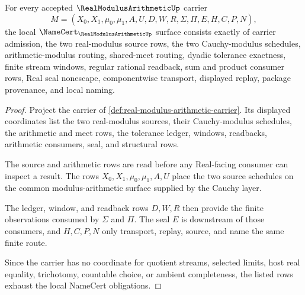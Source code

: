 \begin{theorem}
\label{thm:real-modulus-arithmetic-namecert-obligations}
For every accepted $\RealModulusArithmeticUp$ carrier
$$
M=(X_0,X_1,\mu_0,\mu_1,A,U,D,W,R,\Sigma,\Pi,E,H,C,P,N),
$$
the local $\NameCert_{\RealModulusArithmeticUp}$ surface consists exactly of carrier admission, the two real-modulus source rows, the two Cauchy-modulus schedules, arithmetic-modulus routing, shared-meet routing, dyadic tolerance exactness, finite stream windows, regular rational readback, sum and product consumer rows, Real seal nonescape, componentwise transport, displayed replay, package provenance, and local naming.
\end{theorem}
\begin{proof}
Project the carrier of \autoref{def:real-modulus-arithmetic-carrier}. Its displayed coordinates list the two real-modulus sources, their Cauchy-modulus schedules, the arithmetic and meet rows, the tolerance ledger, windows, readbacks, arithmetic consumers, seal, and structural rows.

The source and arithmetic rows are read before any Real-facing consumer can inspect a result. The rows $X_0,X_1,\mu_0,\mu_1,A,U$ place the two source schedules on the common modulus-arithmetic surface supplied by the Cauchy layer.

The ledger, window, and readback rows $D,W,R$ then provide the finite observations consumed by $\Sigma$ and $\Pi$. The seal $E$ is downstream of those consumers, and $H,C,P,N$ only transport, replay, source, and name the same finite route.

Since the carrier has no coordinate for quotient streams, selected limits, host real equality, trichotomy, countable choice, or ambient completeness, the listed rows exhaust the local NameCert obligations.
\end{proof}

